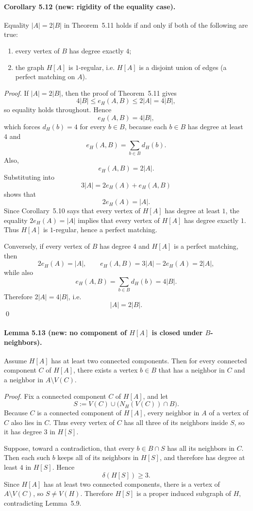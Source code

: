 \paragraph{Corollary 5.12 (new: rigidity of the equality case).}
Equality $|A|=2|B|$ in Theorem~5.11 holds if and only if both of the following are true:
\begin{enumerate}
  \item every vertex of $B$ has degree exactly $4$;
  \item the graph $H[A]$ is $1$-regular, i.e.
  $H[A]$ is a disjoint union of edges (a perfect matching on $A$).
\end{enumerate}

\emph{Proof.}
If $|A|=2|B|$, then the proof of Theorem~5.11 gives
\[
  4|B|\le e_H(A,B)\le 2|A|=4|B|,
\]
so equality holds throughout. Hence
\[
  e_H(A,B)=4|B|,
\]
which forces $d_H(b)=4$ for every $b\in B$, because each $b\in B$ has degree at least $4$ and
\[
  e_H(A,B)=\sum_{b\in B} d_H(b).
\]
Also,
\[
  e_H(A,B)=2|A|.
\]
Substituting into
\[
  3|A|=2e_H(A)+e_H(A,B)
\]
shows that
\[
  2e_H(A)=|A|.
\]
Since Corollary~5.10 says that every vertex of $H[A]$ has degree at least $1$, the equality $2e_H(A)=|A|$ implies that every vertex of $H[A]$ has degree exactly $1$. Thus $H[A]$ is $1$-regular, hence a perfect matching.

Conversely, if every vertex of $B$ has degree $4$ and $H[A]$ is a perfect matching, then
\[
  2e_H(A)=|A|,
  \qquad
  e_H(A,B)=3|A|-2e_H(A)=2|A|,
\]
while also
\[
  e_H(A,B)=\sum_{b\in B} d_H(b)=4|B|.
\]
Therefore $2|A|=4|B|$, i.e.
\[
  |A|=2|B|.
\]
\qed

\paragraph{Lemma 5.13 (new: no component of $H[A]$ is closed under $B$-neighbors).}
Assume $H[A]$ has at least two connected components. Then for every connected component $C$ of $H[A]$, there exists a vertex $b\in B$ that has a neighbor in $C$ and a neighbor in $A\setminus V(C)$.

\emph{Proof.}
Fix a connected component $C$ of $H[A]$, and let
\[
  S:=V(C)\cup \bigl(N_H(V(C))\cap B\bigr).
\]
Because $C$ is a connected component of $H[A]$, every neighbor in $A$ of a vertex of $C$ also lies in $C$. Thus every vertex of $C$ has all three of its neighbors inside $S$, so it has degree $3$ in $H[S]$.

Suppose, toward a contradiction, that every $b\in B\cap S$ has all its neighbors in $C$. Then each such $b$ keeps all of its neighbors in $H[S]$, and therefore has degree at least $4$ in $H[S]$. Hence
\[
  \delta(H[S])\ge 3.
\]
Since $H[A]$ has at least two connected components, there is a vertex of $A\setminus V(C)$, so $S\neq V(H)$. Therefore $H[S]$ is a proper induced subgraph of $H$, contradicting Lemma~5.9.

